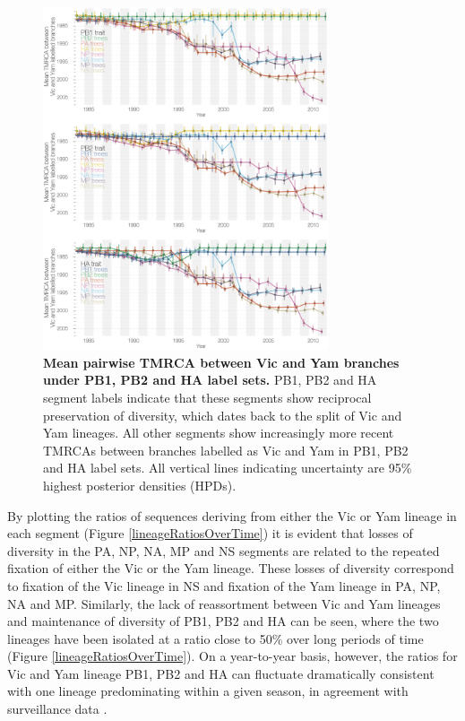 \documentclass[11pt,oneside,letterpaper]{article}
\begin{document}
\begin{figure}[h]
	\centering		
	\includegraphics[width=0.75\textwidth]{figures/InfB_betweenDiversity.png}
	\caption{\textbf{Mean pairwise TMRCA between Vic and Yam branches under PB1, PB2 and HA label sets.}
PB1, PB2 and HA segment labels indicate that these segments show reciprocal preservation of diversity, which dates back to the split of Vic and Yam lineages.
All other segments show increasingly more recent TMRCAs between branches labelled as Vic and Yam in PB1, PB2 and HA label sets.
All vertical lines indicating uncertainty are 95\% highest posterior densities (HPDs).}
	\label{betweenDiversity}
\end{figure}

By plotting the ratios of sequences deriving from either the Vic or Yam lineage in each segment (Figure \ref{lineageRatiosOverTime}) it is evident that losses of diversity in the PA, NP, NA, MP and NS segments are related to the repeated fixation of either the Vic or the Yam lineage.
These losses of diversity correspond to fixation of the Vic lineage in NS and fixation of the Yam lineage in PA, NP, NA and MP.
Similarly, the lack of reassortment between Vic and Yam lineages and maintenance of diversity of PB1, PB2 and HA can be seen, where the two lineages have been isolated at a ratio close to 50\% over long periods of time (Figure \ref{lineageRatiosOverTime}).
On a year-to-year basis, however, the ratios for Vic and Yam lineage PB1, PB2 and HA can fluctuate dramatically consistent with one lineage predominating within a given season, in agreement with surveillance data \cite{reed2012}.
\end{document}
